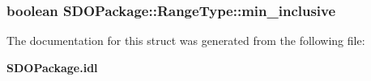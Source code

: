 \subsubsection{\setlength{\rightskip}{0pt plus 5cm}boolean {\bf SDOPackage::Range\-Type::min\_\-inclusive}}\label{structSDOPackage_1_1RangeType_SDOPackage_1_1RangeTypeo2}




The documentation for this struct was generated from the following file:\begin{CompactItemize}
\item 
{\bf SDOPackage.idl}\end{CompactItemize}
